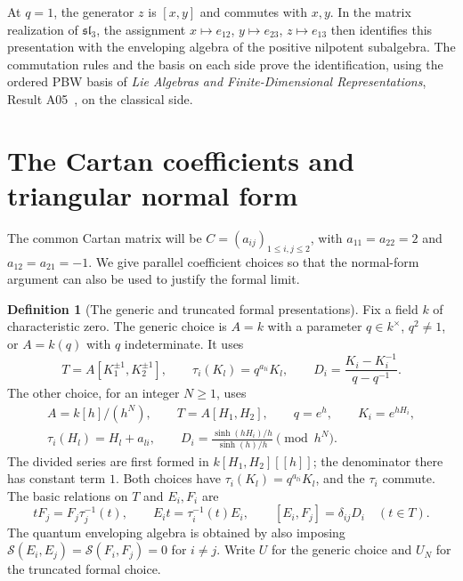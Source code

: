 \documentclass[11pt,oneside,openany]{book}
\theoremstyle{definition}
\newtheorem{definition}[theorem]{Definition}
\theoremstyle{remark}
\begin{document}
At \(q=1\), the generator \(z\) is \([x,y]\) and commutes with
\(x,y\). In the matrix realization of \(\mathfrak{sl}_3\), the
assignment \(x\mapsto e_{12}\), \(y\mapsto e_{23}\),
\(z\mapsto e_{13}\) then identifies this presentation
with the enveloping algebra of the positive nilpotent subalgebra.
The commutation rules and the basis on each side prove the
identification, using the ordered PBW basis of
\emph{Lie Algebras and Finite-Dimensional Representations},
Result A05~\cite[PDF pp.~8--9]{mg-lie}, on the classical side.

\section{The Cartan coefficients and triangular normal form}

The common Cartan matrix will be \(C=(a_{ij})_{1\le i,j\le 2}\),
with \(a_{11}=a_{22}=2\) and \(a_{12}=a_{21}=-1\).
We give parallel coefficient choices so that the normal-form
argument can also be used to justify the formal limit.

\begin{definition}[The generic and truncated formal presentations]
\label{res:UQ02}
Fix a field \(k\) of characteristic zero. The generic choice is
\(A=k\) with a parameter \(q\in k^\times\), \(q^2\ne1\), or
\(A=k(q)\) with \(q\) indeterminate. It uses
\[
 T=A[K_1^{\pm1},K_2^{\pm1}],\qquad
 \tau_i(K_l)=q^{a_{li}}K_l,\qquad
 D_i=\frac{K_i-K_i^{-1}}{q-q^{-1}} .
\]
The other choice, for an integer \(N\ge1\), uses
\[
 \begin{gathered}
 A=k[h]/(h^N),\qquad T=A[H_1,H_2],\qquad
 q=e^h,\qquad K_i=e^{hH_i},\\
 \tau_i(H_l)=H_l+a_{li},\qquad
 D_i=\frac{\sinh(hH_i)/h}{\sinh(h)/h}\pmod {h^N}.
 \end{gathered}
\]
The divided series are first formed in \(k[H_1,H_2][[h]]\);
the denominator there has constant term \(1\).
Both choices have \(\tau_i(K_l)=q^{a_{li}}K_l\), and the
\(\tau_i\) commute. The basic relations on \(T\) and \(E_i,F_i\) are
\[
 t F_j=F_j\tau_j^{-1}(t),\qquad
 E_i t=\tau_i^{-1}(t)E_i,\qquad
 [E_i,F_j]=\delta_{ij}D_i \quad (t\in T).
\]
The quantum enveloping algebra is obtained by also imposing
\(\mathcal S(E_i,E_j)=\mathcal S(F_i,F_j)=0\) for \(i\ne j\).
Write \(U\) for the generic choice and \(U_N\) for the truncated
formal choice.
\end{definition}
\end{document}
